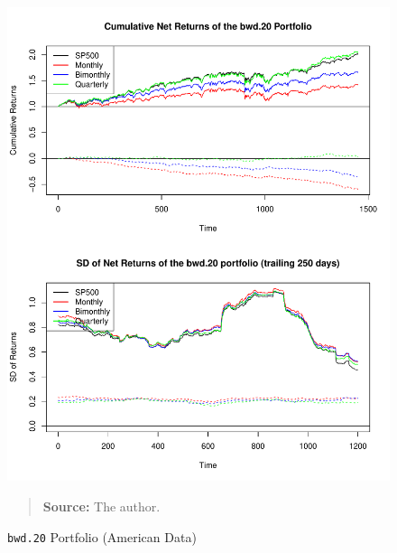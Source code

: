 \documentclass[preprint, doubleblind, authoryear,10pt]{elsarticle}
\begin{document}
\begin{figure}[htpb]
\centering
\footnotesize
\caption{\texttt{bwd.20} Portfolio (American Data)}
\label{fig:spy:bwd.20}
\includegraphics[width=.95\linewidth]{./figs/SP500-retac-bwd-20.pdf}
\begin{quote}
\textbf{Source:} The author.
\end{quote}
\end{figure}
\end{document}

